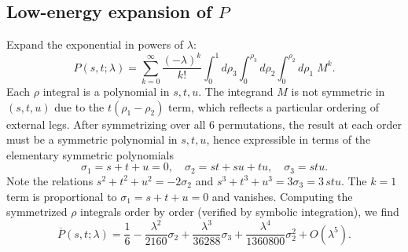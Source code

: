 \subsection{Low-energy expansion of $P$}
Expand the exponential in powers of $\lambda$:
\begin{equation}
P(s,t;\lambda)
=\sum_{k=0}^\infty \frac{(-\lambda)^k}{k!}
\int_0^1 d\rho_3\int_0^{\rho_3}d\rho_2\int_0^{\rho_2}d\rho_1\; M^k.
\end{equation}
Each $\rho$ integral is a polynomial in $s,t,u$.
The integrand $M$ is not symmetric in $(s,t,u)$ due to the $t(\rho_1-\rho_2)$ term, which reflects a particular ordering of external legs. After symmetrizing over all 6 permutations, the result at each order must be a symmetric polynomial in $s,t,u$, hence expressible in terms of the elementary symmetric polynomials
\begin{equation}
\sigma_1 = s+t+u = 0,\quad
\sigma_2 = st+su+tu,\quad
\sigma_3 = stu.
\end{equation}
Note the relations $s^2+t^2+u^2 = -2\sigma_2$ and $s^3+t^3+u^3 = 3\sigma_3 = 3\,stu$.
The $k=1$ term is proportional to $\sigma_1 = s+t+u = 0$ and vanishes.
Computing the symmetrized $\rho$ integrals order by order (verified by symbolic integration), we find
\begin{equation}
\overline{P}(s,t;\lambda)
=\frac{1}{6}
-\frac{\lambda^2}{2160}\sigma_2
+\frac{\lambda^3}{36288}\sigma_3
+\frac{\lambda^4}{1360800}\sigma_2^2
+O(\lambda^5).
\end{equation}

